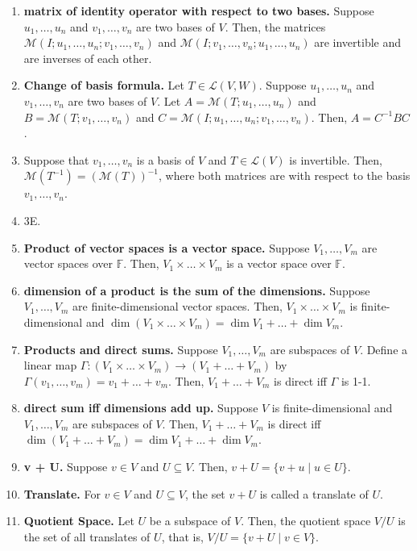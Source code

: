 \begin{enumerate}
	\item \textbf{matrix of identity operator with respect to two bases. } Suppose $u_1,\dots,u_n$ and $v_1,\dots,v_n$ are two bases of $V$. Then, the matrices $\mathscr{M}(I; u_1,\dots,u_n; v_1,\dots,v_n)$ and $\mathscr{M}(I; v_1,\dots,v_n; u_1,\dots,u_n)$ are invertible and are inverses of each other. 
	\item \textbf{Change of basis formula. } Let $T \in \mathscr{L}(V,W)$. Suppose $u_1,\dots,u_n$ and $v_1,\dots,v_n$ are two bases of $V$. Let $A = \mathscr{M}(T; u_1,\dots,u_n)$ and $B = \mathscr{M}(T; v_1,\dots,v_n)$ and $C = \mathscr{M}(I; u_1,\dots,u_n; v_1,\dots,v_n)$. Then, $A = C^{-1}BC$. 
	\item Suppose that $v_1,\dots,v_n$ is a basis of $V$ and $T \in \mathscr{L}(V)$ is invertible. Then, $\mathscr{M}(T^{-1}) = (\mathscr{M}(T))^{-1}$, where both matrices are with respect to the basis $v_1,\dots,v_n$. 
	\item 3E. 
	\item \textbf{Product of vector spaces is a vector space. } Suppose $V_1,\dots,V_m$ are vector spaces over $\mathbb{F}$. Then, $V_1 \times \dots \times V_m$ is a vector space over $\mathbb{F}$. 
	\item \textbf{dimension of a product is the sum of the dimensions. } Suppose $V_1,\dots,V_m$ are finite-dimensional vector spaces. Then, $V_1 \times \dots \times V_m$ is finite-dimensional and $\dim(V_1 \times \dots \times V_m) = \dim V_1 + \dots + \dim V_m$. 
	\item \textbf{Products and direct sums. } Suppose $V_1,\dots,V_m$ are subspaces of $V$. Define a linear map $\Gamma: (V_1 \times \dots \times V_m) \to (V_1 + \dots + V_m)$ by $\Gamma(v_1,\dots,v_m) = v_1 + \dots + v_m$. Then, $V_1 + \dots + V_m$ is direct iff $\Gamma$ is 1-1. 
	\item \textbf{direct sum iff dimensions add up. } Suppose $V$ is finite-dimensional and $V_1,\dots,V_m$ are subspaces of $V$. Then, $V_1 + \dots + V_m$ is direct iff $\dim(V_1 + \dots + V_m) = \dim V_1 + \dots + \dim V_m$. 
	\item \textbf{v + U. } Suppose $v \in V$ and $U \subseteq V$. Then, $v + U = \{v + u \mid u \in U\}$. 
	\item \textbf{Translate. } For $v \in V$ and $U \subseteq V$, the set $v + U$ is called a translate of $U$. 
	\item \textbf{Quotient Space. } Let $U$ be a subspace of $V$. Then, the quotient space $V/U$ is the set of all translates of $U$, that is, $V/U = \{v + U \mid v \in V\}$. 

\end{enumerate}
